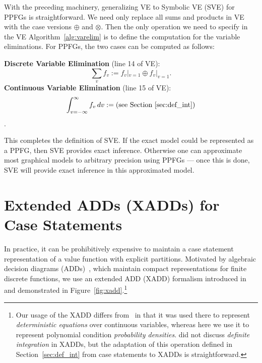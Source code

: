 \documentclass[letterpaper]{article}
\newcommand{\var}{v}
\begin{document}
{With the preceding machinery, generalizing VE to Symbolic VE (SVE) for
PPFGs is straightforward.  We need only replace all sums and products
in VE with the case versions $\oplus$ and $\otimes$.  Then the only
operation we need to specify in the VE Algorithm~\ref{alg:varelim} is
to define the computation for the variable
eliminations.  For PPFGs, the two cases can be computed as follows:

{\bf Discrete Variable Elimination} (line 14 of VE):\\
\vspace{-3mm}
$$\sum_v f_v := f_v|_{v=1} \oplus f_v|_{v=1}.$$
\vspace{-2mm}
{\bf Continuous Variable Elimination} (line 15 of VE):\\ 
$$\int_{\var=-\infty}^{\infty} f_\var \, d\var := \mbox{(see Section~\ref{sec:def_int})}$$.

This completes the definition of SVE.  If the exact model could be
represented as a PPFG, then SVE provides exact inference.  Otherwise
one can approximate most graphical models to arbitrary
precision using PPFGs --- once this is done, 
SVE will provide exact inference in this approximated model.


\section{Extended ADDs (XADDs) for Case Statements}

In practice, it can be prohibitively expensive to maintain a case
statement representation of a value function with explicit partitions.
Motivated by algebraic decision diagrams (ADDs)~\cite{bahar93add},
which maintain compact representations for finite discrete functions,
we use an extended ADD (XADD) formalism introduced 
in~\cite{uai11} and demonstrated in 
Figure~\ref{fig:xadd}.\footnote{Our usage of the XADD differs
from~\cite{uai11} in that it was used there to represent
\emph{deterministic equations} over continuous variables, whereas
here we use it to represent polynomial condition \emph{probability
densities}.  \cite{uai11} did not discuss \emph{definite integration} in XADDs,
but the adaptation of this operation defined in 
Section~\ref{sec:def_int} from case statements to XADDs is straightforward.}

}
\end{document}

